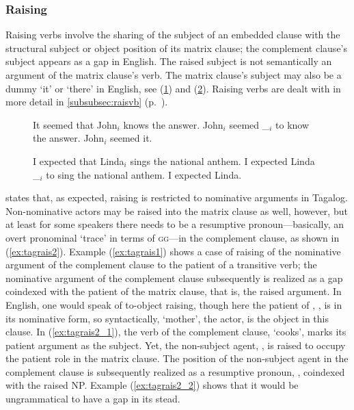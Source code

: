 \subsubsection{Raising}
\label{subsubsec:raising}

Raising verbs involve the sharing of the subject of an embedded clause with the
structural subject or object position of its matrix clause; the complement
clause's subject appears as a gap in English. The raised subject is not
semantically an argument of the matrix clause's verb. The matrix clause's
subject may also be a dummy `it' or `there' in English, see (\ref{ex:engrais})
and (\ref{ex:engrais2}). Raising verbs are dealt with in more detail in 
\autoref{subsubsec:raisvb} (p.~\pageref{subsubsec:raisvb}).

\begin{figure}[h]
\pex\label{ex:engrais}
	\a It seemed that John$_i$ knows the answer.
	\a John$_i$ seemed \_$_i$ to know the answer.
	\a \ljudge* John$_i$ seemed it.
\xe
\end{figure}

\begin{figure}[h]
\pex\label{ex:engrais2}
	\a I expected that Linda$_i$ sings the national anthem.
	\a I expected Linda \_$_i$ to sing the national anthem.
	\a \ljudge\excl I expected Linda.
\xe
\end{figure}

\citet[27--28]{kroeger1991} states that, as expected, raising is restricted to
nominative arguments in Tagalog. Non-nominative actors may be raised into the
matrix clause as well, however, but at least for some speakers there needs to
be a resumptive pronoun---basically, an overt pronominal `trace' in terms of
\textsc{gg}---in the complement clause, as shown in (\ref{ex:tagrais2}).
Example (\ref{ex:tagrais1}) shows a case of raising of the nominative argument
of the complement clause to the patient of a transitive verb; the nominative
argument of the complement clause subsequently is realized as a gap coindexed
with the patient of the matrix clause, that is, the raised argument. In
English, one would speak of to-object raising, though here the patient of
, , is in its nominative form, so syntactically,  `mother', the actor, is the object in this clause. In
(\ref{ex:tagrais2_1}), the verb of the complement clause,  `cooks',
marks its patient argument as the subject. Yet, the non-subject agent,
, is raised to occupy the patient role in the matrix clause. The
position of the non-subject agent in the complement clause is subsequently
realized as a resumptive pronoun, , coindexed with the raised NP.
Example (\ref{ex:tagrais2_2}) shows that it would be ungrammatical to have a
gap in its stead.

